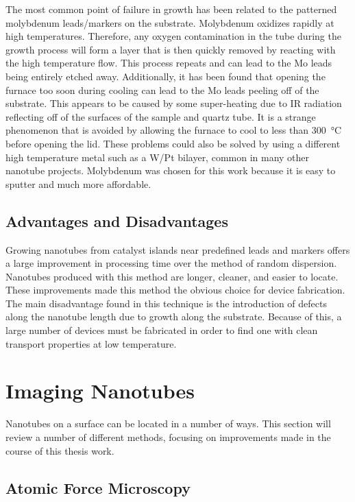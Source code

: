 The most common point of failure in growth has been related to the patterned molybdenum leads/markers on the substrate. Molybdenum oxidizes rapidly at high temperatures. Therefore, any oxygen contamination in the tube during the growth process will form a  layer that is then quickly removed by reacting with the high temperature  flow. This process repeats and can lead to the Mo leads being entirely etched away. Additionally, it has been found that opening the furnace too soon during cooling can lead to the Mo leads peeling off of the substrate. This appears to be caused by some super-heating due to IR radiation reflecting off of the surfaces of the sample and quartz tube. It is a strange phenomenon that is avoided by allowing the furnace to cool to less than \SI{300}{\degreeCelsius} before opening the lid. These problems could also be solved by using a different high temperature metal such as a W/Pt bilayer, common in many other nanotube projects. Molybdenum was chosen for this work because it is easy to sputter and much more affordable.

\subsection{Advantages and Disadvantages}

Growing nanotubes from catalyst islands near predefined leads and markers offers a large improvement in processing time over the method of random dispersion. Nanotubes produced with this method are longer, cleaner, and easier to locate. These improvements made this method the obvious choice for device fabrication. The main disadvantage found in this technique is the introduction of defects along the nanotube length due to growth along the substrate. Because of this, a large number of devices must be fabricated in order to find one with clean transport properties at low temperature.

\section{Imaging Nanotubes}
\label{subsubsec:imaging_disperse}

Nanotubes on a  surface can be located in a number of ways. This section will review a number of different methods, focusing on improvements made in the course of this thesis work.

\subsection{Atomic Force Microscopy}

